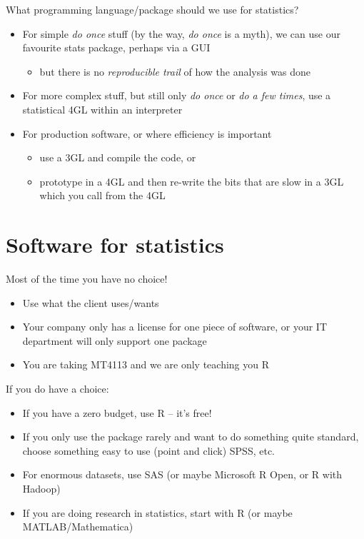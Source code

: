 \documentclass[ignorenonframetext,]{beamer}
\providecommand{\tightlist}{%
  \setlength{\itemsep}{0pt}\setlength{\parskip}{0pt}}
\begin{document}
\begin{frame}{What programming language/package should we use for
statistics?}

\begin{itemize}[<+->]
\tightlist
\item
  For simple \emph{do once} stuff (by the way, \emph{do once} is a
  myth), we can use our favourite stats package, perhaps via a GUI

  \begin{itemize}[<+->]
  \tightlist
  \item
    but there is no \emph{reproducible trail} of how the analysis was
    done
  \end{itemize}
\item
  For more complex stuff, but still only \emph{do once} or \emph{do a
  few times}, use a statistical 4GL within an interpreter
\item
  For production software, or where efficiency is important

  \begin{itemize}[<+->]
  \tightlist
  \item
    use a 3GL and compile the code, or
  \item
    prototype in a 4GL and then re-write the bits that are slow in a 3GL
    which you call from the 4GL
  \end{itemize}
\end{itemize}

\end{frame}

\section{Software for statistics}\label{software-for-statistics}

Most of the time you have no choice!

\begin{itemize}[<+->]
\tightlist
\item
  Use what the client uses/wants
\item
  Your company only has a license for one piece of software, or your IT
  department will only support one package
\item
  You are taking MT4113 and we are only teaching you R
\end{itemize}

\begin{frame}{If you do have a choice:}

\begin{itemize}[<+->]
\tightlist
\item
  If you have a zero budget, use R -- it's free!
\item
  If you only use the package rarely and want to do something quite
  standard, choose something easy to use (point and click) SPSS, etc.
\item
  For enormous datasets, use SAS (or maybe Microsoft R Open, or R with
  Hadoop)
\item
  If you are doing research in statistics, start with R (or maybe
  MATLAB/Mathematica)
\end{itemize}

\end{frame}
\end{document}
